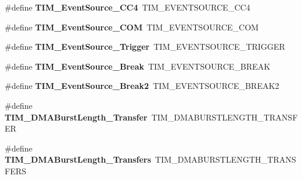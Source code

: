 \begin{DoxyCompactItemize}
\item 
\hypertarget{group___h_a_l___t_i_m___aliased___defines_gab60e3190e6c09d2d067f2c689d614979}{\#define {\bfseries T\-I\-M\-\_\-\-Event\-Source\-\_\-\-C\-C4}~T\-I\-M\-\_\-\-E\-V\-E\-N\-T\-S\-O\-U\-R\-C\-E\-\_\-\-C\-C4}\label{group___h_a_l___t_i_m___aliased___defines_gab60e3190e6c09d2d067f2c689d614979}

\item 
\hypertarget{group___h_a_l___t_i_m___aliased___defines_ga4c06981037fae91786f966aa9b4b3435}{\#define {\bfseries T\-I\-M\-\_\-\-Event\-Source\-\_\-\-C\-O\-M}~T\-I\-M\-\_\-\-E\-V\-E\-N\-T\-S\-O\-U\-R\-C\-E\-\_\-\-C\-O\-M}\label{group___h_a_l___t_i_m___aliased___defines_ga4c06981037fae91786f966aa9b4b3435}

\item 
\hypertarget{group___h_a_l___t_i_m___aliased___defines_ga24835bf5eac25eed90069208dce22564}{\#define {\bfseries T\-I\-M\-\_\-\-Event\-Source\-\_\-\-Trigger}~T\-I\-M\-\_\-\-E\-V\-E\-N\-T\-S\-O\-U\-R\-C\-E\-\_\-\-T\-R\-I\-G\-G\-E\-R}\label{group___h_a_l___t_i_m___aliased___defines_ga24835bf5eac25eed90069208dce22564}

\item 
\hypertarget{group___h_a_l___t_i_m___aliased___defines_gad6f9b5366d93c73ff005273c50c9f00a}{\#define {\bfseries T\-I\-M\-\_\-\-Event\-Source\-\_\-\-Break}~T\-I\-M\-\_\-\-E\-V\-E\-N\-T\-S\-O\-U\-R\-C\-E\-\_\-\-B\-R\-E\-A\-K}\label{group___h_a_l___t_i_m___aliased___defines_gad6f9b5366d93c73ff005273c50c9f00a}

\item 
\hypertarget{group___h_a_l___t_i_m___aliased___defines_ga18fcfb87d3361c3118e7251d5a99b92a}{\#define {\bfseries T\-I\-M\-\_\-\-Event\-Source\-\_\-\-Break2}~T\-I\-M\-\_\-\-E\-V\-E\-N\-T\-S\-O\-U\-R\-C\-E\-\_\-\-B\-R\-E\-A\-K2}\label{group___h_a_l___t_i_m___aliased___defines_ga18fcfb87d3361c3118e7251d5a99b92a}

\item 
\hypertarget{group___h_a_l___t_i_m___aliased___defines_gab87f91f1c5583b9888cb6bb37fc639e2}{\#define {\bfseries T\-I\-M\-\_\-\-D\-M\-A\-Burst\-Length\-\_\-Transfer}~T\-I\-M\-\_\-\-D\-M\-A\-B\-U\-R\-S\-T\-L\-E\-N\-G\-T\-H\-\_\-T\-R\-A\-N\-S\-F\-E\-R}\label{group___h_a_l___t_i_m___aliased___defines_gab87f91f1c5583b9888cb6bb37fc639e2}

\item 
\hypertarget{group___h_a_l___t_i_m___aliased___defines_ga829504c3e8c90a9445f6a223bc3034f8}{\#define {\bfseries T\-I\-M\-\_\-\-D\-M\-A\-Burst\-Length\-\_\-Transfers}~T\-I\-M\-\_\-\-D\-M\-A\-B\-U\-R\-S\-T\-L\-E\-N\-G\-T\-H\-\_\-T\-R\-A\-N\-S\-F\-E\-R\-S}\label{group___h_a_l___t_i_m___aliased___defines_ga829504c3e8c90a9445f6a223bc3034f8}


\end{DoxyCompactItemize}
